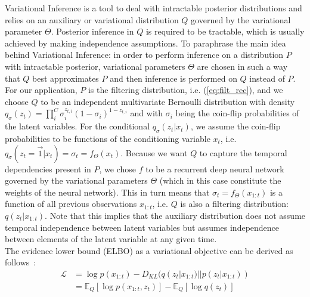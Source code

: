  Variational Inference is a tool to deal with intractable posterior distributions and relies on an auxiliary or variational distribution $Q$ governed by the variational parameter $\Theta$. Posterior inference in $Q$ is required to be tractable, which is usually achieved by making independence assumptions. To paraphrase the main idea behind Variational Inference: in order to perform inference on a distribution $P$ with intractable posterior, variational parameters $\Theta$ are chosen in such a way that $Q$ best approximates $P$ and then inference is performed on $Q$ instead of $P$. For our application, $P$ is the filtering distribution, i.e. (\ref{eq:filt_rec}), and we choose $Q$ to be an independent multivariate Bernoulli distribution with density $q_\sigma(z_t) = \prod_i^C \sigma_i^{z_{t,i}}(1-\sigma_i)^{1-z_{t,i}}$ and with $\sigma_i$ being the coin-flip probabilities of the latent variables. For the conditional $q_\sigma(z_t|x_t)$, we assume the coin-flip probabilities to be functions of the conditioning variable $x_t$, i.e. $q_\sigma(z_{t} =\vec{1}|x_t) = \sigma_{t} = f_\Theta(x_t)$. Because we want $Q$ to capture the temporal dependencies present in $P$, we chose $f$ to be a recurrent deep neural network governed by the variational parameters $\Theta$ (which in this case constitute the weights of the neural network). This in turn means that $\sigma_t = f_\Theta(x_{1:t})$ is a function of all previous observations $x_{1:t}$, i.e. $Q$ is also a filtering distribution: $q(z_t|x_{1:t})$. Note that this implies that the auxiliary distribution does not assume temporal independence between latent variables but assumes independence between elements of the latent variable at any given time.\\
The evidence lower bound (ELBO) as a variational objective can be derived as follows~\cite{blei2011variational}:
\begin{align}
\mathcal{L} &= \log p(x_{1:t}) - D_{KL}(q(z_{t}|x_{1:t}) || p(z_{t}|x_{1:t})) \label{eq:lower_bound}\\
&=  \mathbb{E}_{Q}[\log p(x_{1:t},z_{t})] - \mathbb{E}_{Q}[\log q(z_{t})] \label{eq:elbo_vb}
\end{align}
